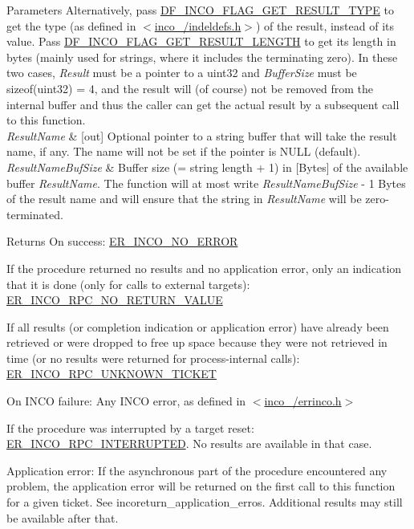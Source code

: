 \begin{DoxyParams}{Parameters}
Alternatively, pass \hyperlink{indeldefs_8h_a2ced59a9816ac78eecb66761e6c56aa8}{D\+F\+\_\+\+I\+N\+C\+O\+\_\+\+F\+L\+A\+G\+\_\+\+G\+E\+T\+\_\+\+R\+E\+S\+U\+L\+T\+\_\+\+T\+Y\+PE} to get the type (as defined in $<$\hyperlink{indeldefs_8h}{inco\+\_/indeldefs.\+h}$>$) of the result, instead of its value. Pass \hyperlink{indeldefs_8h_a38b4f4618d6964e94b19df39dc340af5}{D\+F\+\_\+\+I\+N\+C\+O\+\_\+\+F\+L\+A\+G\+\_\+\+G\+E\+T\+\_\+\+R\+E\+S\+U\+L\+T\+\_\+\+L\+E\+N\+G\+TH} to get its length in bytes (mainly used for strings, where it includes the terminating zero). In these two cases, {\itshape Result} must be a pointer to a {\ttfamily uint32} and {\itshape Buffer\+Size} must be {\ttfamily sizeof(uint32)} = 4, and the result will (of course) not be removed from the internal buffer and thus the caller can get the actual result by a subsequent call to this function. \\
\hline
{\em Result\+Name} & \mbox{[}out\mbox{]} Optional pointer to a string buffer that will take the result name, if any. The name will not be set if the pointer is N\+U\+LL (default). \\
\hline
{\em Result\+Name\+Buf\+Size} & Buffer size (= string length + 1) in \mbox{[}Bytes\mbox{]} of the available buffer {\itshape Result\+Name}. The function will at most write {\itshape Result\+Name\+Buf\+Size} -\/ 1 Bytes of the result name and will ensure that the string in {\itshape Result\+Name} will be zero-\/terminated. \\
\hline
\end{DoxyParams}
\begin{DoxyReturn}{Returns}
On success\+: \hyperlink{errinco_8h_ac806a12a2f08c29e901360403c9e239e}{E\+R\+\_\+\+I\+N\+C\+O\+\_\+\+N\+O\+\_\+\+E\+R\+R\+OR} 

If the procedure returned no results and no application error, only an indication that it is done (only for calls to external targets)\+: \hyperlink{errinco_8h_a8d818cdfabc610635069cde0387cf43a}{E\+R\+\_\+\+I\+N\+C\+O\+\_\+\+R\+P\+C\+\_\+\+N\+O\+\_\+\+R\+E\+T\+U\+R\+N\+\_\+\+V\+A\+L\+UE} 

If all results (or completion indication or application error) have already been retrieved or were dropped to free up space because they were not retrieved in time (or no results were returned for process-\/internal calls)\+: \hyperlink{errinco_8h_a0cb9cbd56f7aa78ac186c79f03aa9c32}{E\+R\+\_\+\+I\+N\+C\+O\+\_\+\+R\+P\+C\+\_\+\+U\+N\+K\+N\+O\+W\+N\+\_\+\+T\+I\+C\+K\+ET} 

On I\+N\+CO failure\+: Any I\+N\+CO error, as defined in $<$\hyperlink{errinco_8h}{inco\+\_/errinco.\+h}$>$ 

If the procedure was interrupted by a target reset\+: \hyperlink{errinco_8h_a7d44ee063ff87c44112580cc6042872d}{E\+R\+\_\+\+I\+N\+C\+O\+\_\+\+R\+P\+C\+\_\+\+I\+N\+T\+E\+R\+R\+U\+P\+T\+ED}. No results are available in that case. 

Application error\+: If the asynchronous part of the procedure encountered any problem, the application error will be returned on the first call to this function for a given ticket. See incoreturn\+\_\+application\+\_\+erros. Additional results may still be available after that.
\end{DoxyReturn}
